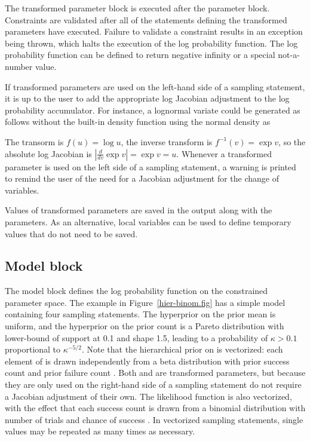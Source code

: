 \documentclass[article]{jss}
\begin{document}
The transformed parameter block is executed after the parameter
block.  Constraints are validated after all of the statements defining the
transformed parameters have executed.  Failure to validate a
constraint results in an exception being thrown, which halts the
execution of the log probability function.  The log probability
function can be defined to return negative infinity or a special
not-a-number value. 

If transformed parameters are used on the left-hand side of a sampling
statement, it is up to the user to add the appropriate log Jacobian
adjustment to the log probability accumulator.  For instance, a
lognormal variate could be generated as follows without the built-in
 density function  using the normal density as
%
\begin{Code}
parameters {
  real<lower=0> u;
  ...
transformed parameters {
  real v;
  v <- log(u);
  increment_log_prob(u);      // log absolute Jacobian adjustment
}
model {
  v ~ normal(0,1);
}
\end{Code}
%
The transorm is $f(u) = \log u$, the inverse transform is $f^{-1}(v) =
\exp v$, so the absolute log Jacobian is $|\frac{d}{dv} \exp v| =
\exp v = u$.  Whenever a transformed parameter is used on the left
side of a sampling statement, a warning is printed to remind the user
of the need for a Jacobian adjustment for the change of variables.

Values of transformed parameters are saved in the output along
with the parameters.  As an alternative, local variables can be used
to define temporary values that do not need to be saved.  

\subsection{Model block}

The model block defines the log probability function on the
constrained parameter space.  The example in
Figure~\ref{hier-binom.fig} has a simple model containing four
sampling statements.  The hyperprior on the prior mean 
is uniform, and the hyperprior on the prior count  is a
Pareto distribution with lower-bound of support at 0.1 and shape 1.5,
leading to a probability of $\kappa > 0.1$ proportional to
$\kappa^{-5/2}$.  Note that the hierarchical prior on  is
vectorized: each element of  is drawn independently from
a beta distribution with prior success count  and prior
failure count .  Both  and  are
transformed parameters, but because they are only used on the
right-hand side of a sampling statement do not require a Jacobian
adjustment of their own.  The likelihood function is also vectorized,
with the effect that each success count  is drawn from a
binomial distribution with number of trials  and chance of
success .  In vectorized sampling statements, single
values may be repeated as many times as necessary.
\end{document}
